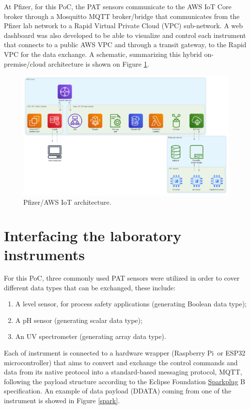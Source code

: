 \documentclass[10pt]{article}
\begin{document}
At Pfizer, for this PoC, the PAT sensors communicate to the AWS IoT Core broker
through a Mosquitto MQTT broker/bridge that communicates from 
the Pfizer lab network to a Rapid Virtual Private Cloud (VPC) sub-network. 
A web dashboard was also developed to be able to visualize and control 
each instrument that connects to a public AWS VPC and through a transit 
gateway, to the Rapid VPC for the data exchange. A schematic, summarizing 
this hybrid on-premise/cloud architecture is shown on Figure \ref{architecture}.

\begin{figure}[h]
\centering
\includegraphics[width=1\textwidth]{architecture}
\caption{Pfizer/AWS IoT architecture.}
\label{architecture}
\end{figure}


\section*{Interfacing the laboratory instruments}
For this PoC, three commonly used PAT sensors were utilized in order
to cover different data types that can be exchanged, these include:
\begin{enumerate}
	\item A level sensor, for process safety applications
	(generating Boolean data type);
	\item A pH sensor (generating scalar data type);
	\item An UV spectrometer (generating array data type).
\end{enumerate}
Each of instrument is connected to a hardware wrapper
(Raspberry Pi\texttrademark\ or ESP32 microcontroller)
that aims to convert and exchange the control commands and data from 
its native protocol into a standard-based messaging protocol, MQTT, following
the payload structure according to the Eclipse Foundation
\href{https://sparkplug.eclipse.org/specification/version/2.2/documents/sparkplug-specification-2.2.pdf}{Sparkplug\texttrademark} B specification. An example of data payload 
(DDATA) coming from one of the instrument is showed in Figure \ref{spark}.
\end{document}
